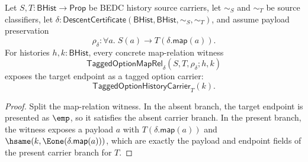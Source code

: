 \begin{theorem}
\label{thm:tagged-option-maprel-target-carrier}
Let $S,T:\mathsf{BHist}\to\mathsf{Prop}$ be BEDC history source carriers, let
$\sim_S$ and $\sim_T$ be source classifiers, let
$\delta:\mathsf{DescentCertificate}(\mathsf{BHist},\mathsf{BHist},\sim_S,\sim_T)$,
and assume payload preservation
$$
\rho_{\delta}:\forall a.\;S(a)\to T(\delta.\mathsf{map}(a)).
$$
For histories $h,k:\mathsf{BHist}$, every concrete map-relation witness
$$
\mathsf{TaggedOptionMapRel}_{\delta}(S,T,\rho_{\delta};h,k)
$$
exposes the target endpoint as a tagged option carrier:
$$
\mathsf{TaggedOptionHistoryCarrier}_T(k).
$$
\end{theorem}
\begin{proof}
Split the map-relation witness. In the absent branch, the target endpoint is
presented as $\emp$, so it satisfies the absent carrier branch. In the present
branch, the witness exposes a payload $a$ with
$T(\delta.\mathsf{map}(a))$ and
$\hsame(k,\Eone(\delta.\mathsf{map}(a)))$, which are exactly the payload and
endpoint fields of the present carrier branch for $T$.
\end{proof}

